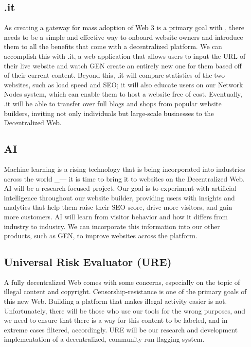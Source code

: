 \documentclass{kwp-builder}
\begin{document}
\subsection{\konjure.it}

\tab As creating a gateway for mass adoption of Web 3 is a primary goal with \konjure, there needs to be a simple and effective way to onboard website owners and introduce them to all the benefits that come with a decentralized platform. We can accomplish this with \konjure.it, a web application that allows users to input the URL of their live website and watch \konjure GEN create an entirely new one for them based off of their current content. Beyond this, \konjure.it will compare statistics of the two websites, such as load speed and SEO; it will also educate users on our Network Nodes system, which can enable them to host a website free of cost. Eventually, \konjure.it will be able to transfer over full blogs and shops from popular website builders, inviting not only individuals but large-scale businesses to the Decentralized Web.

\newpage

\subsection{\konjure AI}

\tab Machine learning is a rising technology that is being incorporated into industries across the world \_{—} it is time to bring it to websites on the Decentralized Web. \konjure AI will be a research-focused project. Our goal is to experiment with artificial intelligence throughout our website builder, providing users with insights and analytics that help them raise their SEO score, drive more visitors, and gain more customers. \konjure AI will learn from visitor behavior and how it differs from industry to industry. We can incorporate this information into our other products, such as \konjure GEN, to improve websites across the platform.

\subsection{Universal Risk Evaluator (URE)}

\tab A fully decentralized Web comes with some concerns, especially on the topic of illegal content and copyright. Censorship-resistance is one of the primary goals of this new Web. Building a platform that makes illegal activity easier is not. Unfortunately, there will be those who use our tools for the wrong purposes, and we need to ensure that there is a way for this content to be labeled, and in extreme cases filtered, accordingly. URE will be our research and development implementation of a decentralized, community-run flagging system.
\end{document}
